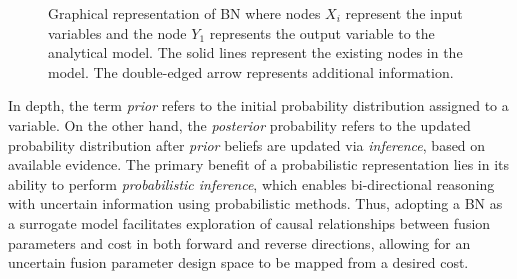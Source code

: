 \documentclass[journal]{IEEEtran}
\begin{document}
\begin{figure}[ht]
    \caption{\small Graphical representation of BN where nodes $X_i$ represent the input variables and the node $Y_1$ represents the output variable to the analytical model. The solid lines represent the existing nodes in the model. The double-edged arrow represents additional information.}\label{fig:BN3} 
\end{figure}

In depth, the term \textit{prior} refers to the initial probability distribution assigned to a variable. On the other hand, the \textit{posterior} probability refers to the updated probability distribution after \textit{prior} beliefs are updated via \textit{inference}, based on available evidence. The primary benefit of a probabilistic representation lies in its ability to perform \textit{probabilistic inference}, which enables bi-directional reasoning with uncertain information using probabilistic methods. Thus, adopting a BN as a surrogate model facilitates exploration of causal relationships between fusion parameters and cost in both forward and reverse directions, allowing for an uncertain fusion parameter design space to be mapped from a desired cost. 
\end{document}
